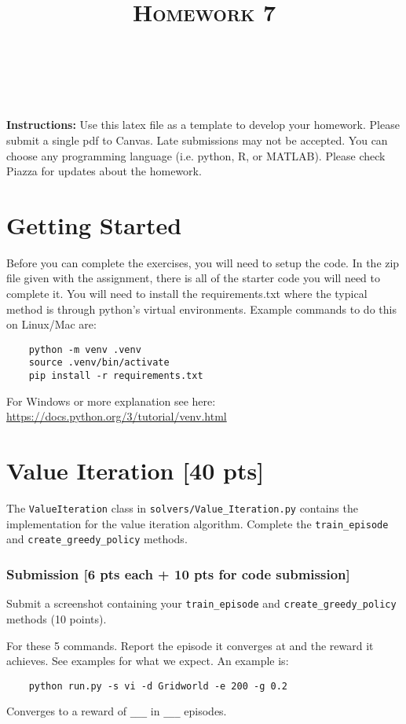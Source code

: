 \documentclass[a4paper]{article}
\title{\textsc{Homework 7}} %
\author{
\red{$>>$NAME HERE$<<$} \\
\red{$>>$ID HERE$<<$}\\
}
\date{}
\theoremstyle{definition}
\begin{document}
\maketitle 

\textbf{Instructions:}
Use this latex file as a template to develop your homework. Please submit a single pdf to Canvas. Late submissions may not be accepted. You can choose any programming language (i.e. python, R, or MATLAB). Please check Piazza for updates about the homework.
\vspace{0.1in}

\section{Getting Started}
Before you can complete the exercises, you will need to setup the code.
%
In the zip file given with the assignment, there is all of the starter code you will need to complete it.
%
You will need to install the requirements.txt where the typical method is through python's virtual environments.
%
Example commands to do this on Linux/Mac are:
\begin{verbatim}
    python -m venv .venv
    source .venv/bin/activate
    pip install -r requirements.txt 
\end{verbatim}
%

For Windows or more explanation see here: \url{https://docs.python.org/3/tutorial/venv.html}

\section{Value Iteration [40 pts]}

The \verb|ValueIteration| class in \verb|solvers/Value_Iteration.py| contains the implementation for the value iteration algorithm. Complete the \verb|train_episode| and \verb|create_greedy_policy| methods.

\subsubsection*{Submission [6 pts each + 10 pts for code submission]}

Submit a screenshot containing your \verb|train_episode| and \verb|create_greedy_policy| methods (10 points). 

\vspace{5mm}
For these 5 commands. Report the episode it converges at and the reward it achieves. See examples for what we expect. An example is: \begin{verbatim}
    python run.py -s vi -d Gridworld -e 200 -g 0.2
\end{verbatim}
Converges to a reward of \verb|___| in \verb|___| episodes.
\end{document}
